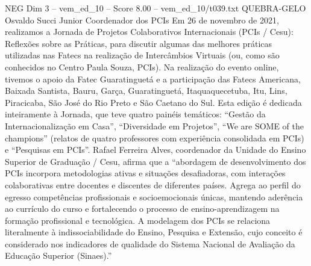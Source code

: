 \begin{textsample}{NEG Dim 3 – vem\_ed\_10 – Score 8.00 – vem\_ed\_10/t039.txt}  \label{ex:f3_neg_130}
QUEBRA-GELO Osvaldo Succi Junior Coordenador dos PCIs Em 26 de novembro de 2021, realizamos a Jornada de Projetos Colaborativos Internacionais (PCIs / Cesu): Reflexões sobre as Práticas, para discutir algumas das melhores práticas utilizadas nas Fatecs na realização de Intercâmbios Virtuais (ou, como são conhecidos no Centro Paula Souza, PCIs).
Na realização do evento online, tivemos o apoio da Fatec Guaratinguetá e a participação das Fatecs Americana, Baixada Santista, Bauru, Garça, Guaratinguetá, Itaquaquecetuba, Itu, Lins, Piracicaba, São José do Rio Preto e São Caetano do Sul.
Esta edição é dedicada inteiramente à Jornada, que teve quatro painéis temáticos: “Gestão da Internacionalização em Casa”, “Diversidade em Projetos”, “We are SOME of the champions” (relatos de quatro professores com experiência consolidada em PCIs) e “Pesquisas em PCIs”.
Rafael Ferreira Alves, coordenador da Unidade do Ensino Superior de Graduação / Cesu, afirma que a “abordagem de desenvolvimento dos PCIs incorpora metodologias ativas e situações desafiadoras, com interações colaborativas entre docentes e discentes de diferentes países.
Agrega ao perfil do egresso competências profissionais e socioemocionais únicas, mantendo aderência ao currículo do curso e fortalecendo o processo de ensino-aprendizagem na formação profissional e tecnológica.
A modelagem dos PCIs se relaciona literalmente à indissociabilidade do Ensino, Pesquisa e Extensão, cujo conceito é considerado nos indicadores de qualidade do Sistema Nacional de Avaliação da Educação Superior (Sinaes).”

\end{textsample}

